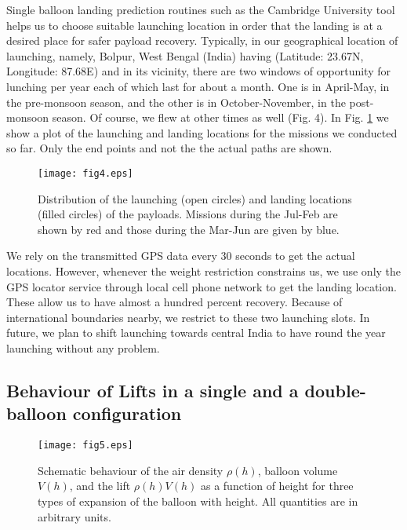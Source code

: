 Single balloon landing prediction routines such as the Cambridge University 
\citep{habhub} tool helps us to choose suitable 
launching location in order that the landing is at a desired place for safer payload 
recovery. Typically, in our geographical location of launching,
namely, Bolpur, West Bengal (India) having (Latitude: 23.67N, Longitude: 87.68E)
and in its vicinity, there are two windows of opportunity for lunching
per year each of which last for about a month. One is in April-May, in the pre-monsoon season, 
and the other is in October-November, in the post-monsoon season. Of course, we flew at other times as well (Fig. 4). 
In Fig. \ref{fig:locs} we show a plot of the launching and landing locations
for the missions we conducted so far. Only the end points and not the
the actual paths are shown.

\begin{figure}[h]
  \centering
  \texttt{[image: fig4.eps]}
  \caption{Distribution of the launching (open circles) and landing locations (filled circles) 
of the payloads. Missions during the Jul-Feb are shown by red and those during the
   Mar-Jun are given by blue.}
   \label{fig:locs}
\end{figure}

We rely on the transmitted GPS data every 30 seconds to get the actual locations.
However, whenever the weight restriction constrains us, we use only the GPS locator 
service through local cell phone network to get the landing location. These allow us 
to have almost a hundred percent recovery. Because of international boundaries nearby,
we restrict to these two launching slots. In future, we plan to shift launching towards
central India to have round the year launching without any problem.

\subsection{Behaviour of Lifts in a single and a double-balloon configuration}
\label{ssec:dbal}

\begin{figure}[h]
  \centering
  \texttt{[image: fig5.eps]}
  \caption{Schematic behaviour of the air density $\rho(h)$, 
balloon volume $V(h)$,  and the lift $\rho(h)V(h)$ as a function of height for three types of expansion of 
the balloon with height. All quantities are in arbitrary units.}
   \label{fig:singrhov}
\end{figure}


